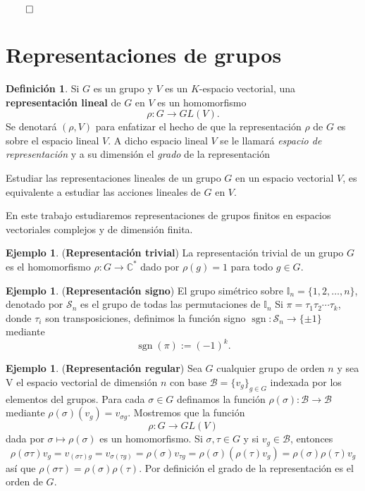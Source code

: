 \documentclass[12pt]{book}
\theoremstyle{definition}
\newtheorem{definition}[theorem]{Definición}
\newtheorem{example}[theorem]{Ejemplo}
\DeclareMathOperator{\sgn}{sgn}
\newcounter{in}
\newcounter{ini}
\begin{document}
$\qed$

\section{Representaciones de grupos}

\begin{definition}
  Si $G$ es un grupo y $V$ es un $K$-espacio vectorial, una
  \textbf{representación lineal} de $G$ en $V$ es un homomorfismo 
     $$\rho:G\rightarrow GL(V).$$
  Se denotará $(\rho,V)$ para enfatizar el hecho de que la
  representación $\rho$ de $G$  es sobre el espacio lineal $V$. A
  dicho espacio lineal $V$ se le llamará \emph{espacio de representación} y a
  su dimensión el \emph{grado} de la representación 
\end{definition}

Estudiar las representaciones lineales de un grupo $G$ en un espacio
vectorial $V$, es equivalente a estudiar las acciones lineales de $G$
en $V$. 

En este trabajo estudiaremos representaciones de grupos finitos en
espacios vectoriales complejos y de dimensión finita. 

\begin{example}(\textbf{Representación trivial})
  La representación trivial de un grupo $G$ es el homomorfismo
  $\rho:G\rightarrow \mathbb{C^{*}}$ dado por $\rho(g)=1$ para todo
  $g\in G$.
\end{example}

\begin{example}(\textbf{Representación signo})
  El grupo simétrico sobre $\mathbb{I}_{n}=\{1,2,\ldots,n\}$, denotado
  por $\mathcal{S}_{n}$ es el grupo de todas las permutaciones de $\mathbb{I}_{n}$ 
  Si $\pi=\tau_{1}\tau_{2}\cdots\tau_{k}$, donde $\tau_{i}$ son
  transposiciones, definimos la función signo
  $\sgn:\mathcal{S}_{n} \rightarrow\{\pm1\}$ mediante $$\sgn(\pi):=(-1)^{k}.$$
\end{example}

\begin{example}(\textbf{Representación regular})
  Sea $G$ cualquier grupo de orden $n$ y sea V el espacio vectorial de
  dimensión $n$ con base $\mathcal{B}=\{v_{g}\}_{g\in G}$ indexada por
  los elementos del grupos. Para cada $\sigma\in G$ definamos la función
  $\rho(\sigma):\mathcal{B}\rightarrow \mathcal{B}$ mediante $\rho(\sigma)(v_{g})=v_{\sigma g}$.
  Mostremos que la función $$\rho:G\rightarrow GL(V)$$ dada por
  $\sigma\mapsto\rho(\sigma)$ es un homomorfismo. Si $\sigma,\tau \in G$
  y si $v_{g}\in \mathcal{B}$, entonces $$\rho(\sigma
  \tau)v_{g}=v_{(\sigma\tau)g}=v_{\sigma(\tau g)}=\rho(\sigma)v_{\tau
    g}=\rho(\sigma)(\rho(\tau)v_{g})=\rho(\sigma)\rho(\tau)v_{g} $$
  así que $\rho(\sigma\tau)=\rho(\sigma)\rho(\tau)$. Por definición el 
  grado de la representación es el orden de $G$.
\end{example}
\end{document}
